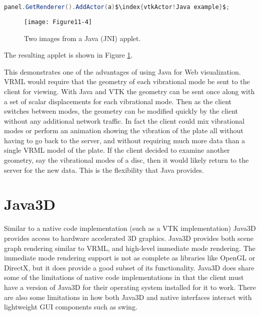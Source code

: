 \begin{lstlisting}[language=Java, caption={}, numbers=none, frame=none, escapechar=\$]
panel.GetRenderer().AddActor(a)$\index{vtkActor!Java example}$;
\end{lstlisting}

\begin{figure}[!htb]
  \centering
  \texttt{[image: Figure11-4]}\\
  \caption{Two images from a Java (JNI) applet.}\label{fig:Figure11-4}
\end{figure}


The resulting applet is shown in Figure \ref{fig:Figure11-4}.

This demonstrates one of the advantages of using Java for Web visualization. VRML would require that the geometry of each vibrational mode be sent to the client for viewing. With Java and VTK the geometry can be sent once along with a set of scalar displacements for each vibrational mode. Then as the client switches between modes, the geometry can be modified quickly by the client without any additional network traffic. In fact the client could mix vibrational modes or perform an animation showing the vibration of the plate all without having to go back to the server, and without requiring much more data than a single VRML model of the plate. If the client decided to examine another geometry, say the vibrational modes of a disc, then it would likely return to the server for the new data. This is the flexibility that Java provides.

\section{Java3D}

Similar to a native code implementation (such as a VTK implementation) Java3D provides access to hardware accelerated 3D graphics. Java3D provides both scene graph rendering similar to VRML, and high-level immediate mode rendering. The immediate mode rendering support is not as complete as libraries like OpenGL or DirectX, but it does provide a good subset of its functionality. Java3D does share some of the limitations of native code implementations in that the client must have a version of Java3D for their operating system installed for it to work. There are also some limitations in how both Java3D and native interfaces interact with lightweight GUI components such as swing.

